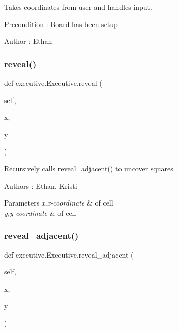 Takes coordinates from user and handles input. 

\begin{DoxyPrecond}{Precondition}
\+: Board has been setup 
\end{DoxyPrecond}
\begin{DoxyAuthor}{Author}
\+: Ethan 
\end{DoxyAuthor}
\mbox{\label{classexecutive_1_1_executive_a6c8b73fd28d41e64cbd8b259d3c92ae8}} 
\subsubsection{\texorpdfstring{reveal()}{reveal()}}
{\footnotesize\ttfamily def executive.\+Executive.\+reveal (\begin{DoxyParamCaption}\item[{}]{self,  }\item[{}]{x,  }\item[{}]{y }\end{DoxyParamCaption})}



Recursively calls \mbox{\hyperlink{classexecutive_1_1_executive_a9d0ec27d177df404e872ffe9c2faf4ba}{reveal\+\_\+adjacent()}} to uncover squares. 

\begin{DoxyAuthor}{Authors}
\+: Ethan, Kristi 
\end{DoxyAuthor}

\begin{DoxyParams}{Parameters}
{\em x,x-\/coordinate} & of cell \\
\hline
{\em y,y-\/coordinate} & of cell \\
\hline
\end{DoxyParams}
\mbox{\label{classexecutive_1_1_executive_a9d0ec27d177df404e872ffe9c2faf4ba}} 
\subsubsection{\texorpdfstring{reveal\+\_\+adjacent()}{reveal\_adjacent()}}
{\footnotesize\ttfamily def executive.\+Executive.\+reveal\+\_\+adjacent (\begin{DoxyParamCaption}\item[{}]{self,  }\item[{}]{x,  }\item[{}]{y }\end{DoxyParamCaption})}



